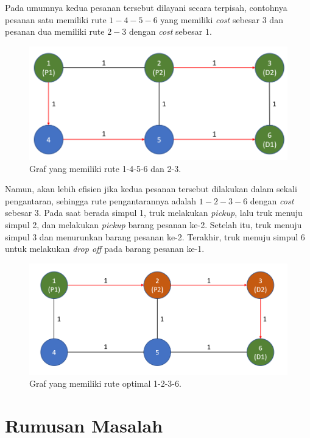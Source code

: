Pada umumnya kedua pesanan tersebut dilayani secara terpisah, contohnya pesanan satu memiliki rute $1-4-5-6$
yang memiliki \textit{cost} sebesar $3$ dan pesanan dua memiliki rute $2-3$ dengan \textit{cost} sebesar $1$.

\begin{figure}[H]
    \centering
    \includegraphics[width=1.0\textwidth]{resources/graph_routes.png}
    \caption{Graf yang memiliki rute 1-4-5-6 dan 2-3.}
\end{figure}

Namun, akan lebih efisien jika kedua pesanan tersebut dilakukan dalam sekali pengantaran, sehingga rute pengantarannya adalah $1-2-3-6$ dengan \textit{cost} sebesar $3$.
Pada saat berada simpul 1, truk melakukan \textit{pickup}, lalu truk menuju simpul 2, dan melakukan \textit{pickup} barang pesanan ke-2. Setelah itu, truk menuju simpul 3
dan menurunkan barang pesanan ke-2. Terakhir, truk menuju simpul 6  untuk melakukan \textit{drop off} pada barang pesanan ke-1.

\begin{figure}[H]
    \centering
    \includegraphics[width=1.0\textwidth]{resources/graph_optimal.png}
    \caption{Graf yang memiliki rute optimal 1-2-3-6.}
\end{figure}

\section{Rumusan Masalah}

